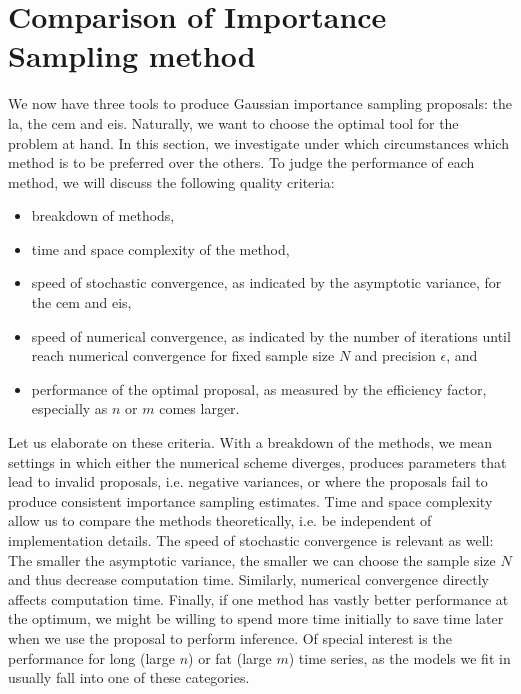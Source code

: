 \section{Comparison of Importance Sampling method}
\label{sec:simulation_studies}

We now have three tools to produce Gaussian importance sampling proposals: the \gls{la}, the \gls{cem} and \gls{eis}. Naturally, we want to choose the optimal tool for the problem at hand. In this section, we investigate under which circumstances which method is to be preferred over the others. To judge the performance of each method, we will discuss the following quality criteria:
\begin{itemize}
    \item breakdown of methods,
    \item time and space complexity of the method,
    \item speed of stochastic convergence, as indicated by the asymptotic variance, for the \gls{cem} and \gls{eis},
    \item speed of numerical convergence, as indicated by the number of iterations until  reach numerical convergence for fixed sample size $N$ and precision $\epsilon$, and
    \item performance of the optimal proposal, as measured by the efficiency factor, especially as $n$ or $m$ comes larger. 
\end{itemize}
Let us elaborate on these criteria. With a breakdown of the methods, we mean settings in which either the numerical scheme diverges, produces parameters that lead to invalid proposals, i.e. negative variances, or where the proposals fail to produce consistent importance sampling estimates. 
Time and space complexity allow us to compare the methods theoretically, i.e. be independent of implementation details. The speed of stochastic convergence is relevant as well: The smaller the asymptotic variance, the smaller we can choose the sample size $N$ and thus decrease computation time. Similarly, numerical convergence directly affects computation time.  Finally, if one method has vastly better performance at the optimum, we might be willing to spend more time initially to save time later when we use the proposal to perform inference. Of special interest is the performance for long (large $n$) or fat (large $m$) time series, as the models we fit in  usually fall into one of these categories.

